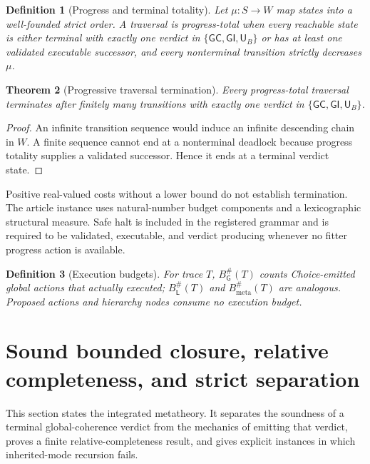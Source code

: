 \documentclass[10pt]{article}
\newtheorem{definition}{Definition}[section]
\newtheorem{theorem}[definition]{Theorem}
\newcommand{\Loc}{\mathsf L}
\newcommand{\Glob}{\mathsf G}
\newcommand{\GC}{\mathsf{GC}}
\newcommand{\GI}{\mathsf{GI}}
\newcommand{\UB}{\mathsf{U}_B}
\begin{document}
\begin{definition}[Progress and terminal totality]
Let $\mu:S\to W$ map states into a well-founded strict order.  A traversal is progress-total when every reachable state is either terminal with exactly one verdict in $\{\GC,\GI,\UB\}$ or has at least one validated executable successor, and every nonterminal transition strictly decreases $\mu$.
\end{definition}

\begin{theorem}[Progressive traversal termination]\label{thm:termination}
Every progress-total traversal terminates after finitely many transitions with exactly one verdict in $\{\GC,\GI,\UB\}$.
\end{theorem}

\begin{proof}
An infinite transition sequence would induce an infinite descending chain in $W$.  A finite sequence cannot end at a nonterminal deadlock because progress totality supplies a validated successor.  Hence it ends at a terminal verdict state.
\end{proof}

Positive real-valued costs without a lower bound do not establish termination.  The article instance uses natural-number budget components and a lexicographic structural measure.  Safe halt is included in the registered grammar and is required to be validated, executable, and verdict producing whenever no fitter progress action is available.

\begin{definition}[Execution budgets]
For trace $T$, $B_{\Glob}^{\#}(T)$ counts Choice-emitted global actions that actually executed; $B_{\Loc}^{\#}(T)$ and $B_{\mathrm{meta}}^{\#}(T)$ are analogous.  Proposed actions and hierarchy nodes consume no execution budget.
\end{definition}



\section{Sound bounded closure, relative completeness, and strict separation}

This section states the integrated metatheory.  It separates the soundness of a terminal global-coherence verdict from the mechanics of emitting that verdict, proves a finite relative-completeness result, and gives explicit instances in which inherited-mode recursion fails.
\end{document}
